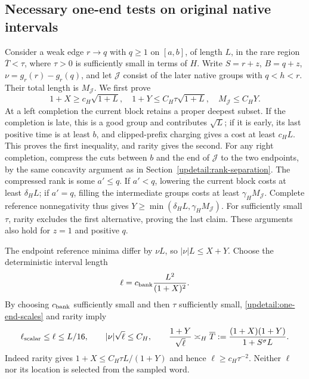 \subsection{Necessary one-end tests on original native intervals}
\label{updetail:one-end-banks}
Consider a weak edge $r\to q$ with $q\geq1$ on $[a,b]$, of length
$L$, in the rare region $\overline T<\tau$, where $\tau>0$ is
sufficiently small in terms of $H$. Write $S=r+z$, $B=q+z$, $\nu=g_r(r)-g_r(q)$, and let
$\mathcal J$ consist of the later native groups with $q<h<r$.
Their total length is $M_{\mathcal J}$.
We first prove
\begin{equation}
 1+X\geq c_H\sqrt{1+L},\quad
 1+Y\leq C_H\tau\sqrt{1+L},\quad M_{\mathcal J}\leq C_HY.
 \label{updetail:one-end-scales}
\end{equation}
At a left completion the current block retains a proper deepest
subset. If the completion is late, this is a good group and contributes
$\sqrt L$; if it is early, its last positive time is at least $b$,
and clipped-prefix charging gives a cost at least $c_HL$.
This proves the first inequality, and rarity gives the second.
For any right completion, compress the cuts between $b$ and the end
of $\mathcal J$ to the two endpoints, by the same concavity argument
as in Section~\ref{updetail:rank-separation}. The compressed rank is
some $a'\leq q$. If $a'<q$, lowering the current block costs at least
$\delta_HL$; if $a'=q$, filling the intermediate groups costs at least
$\gamma_HM_{\mathcal J}$. Complete reference nonnegativity thus gives
$Y\geq\min(\delta_HL,\gamma_HM_{\mathcal J})$. For sufficiently small
$\tau$, rarity excludes the first alternative, proving the last claim.
These arguments also hold for $z=1$ and positive $q$.

The endpoint reference minima differ by $\nu L$, so
$|\nu|L\leq X+Y$. Choose the deterministic interval length
\begin{equation}
 \ell=c_{\rm bank}\frac{L^2}{(1+X)^2}.
 \label{updetail:effective-length}
\end{equation}
By choosing $c_{\rm bank}$ sufficiently small and then $\tau$
sufficiently small, \eqref{updetail:one-end-scales} and rarity imply
\[
 \ell_{\rm scalar}\leq\ell\leq L/16,
 \qquad |\nu|\sqrt\ell\leq C_H,
 \qquad
 \frac{1+Y}{\sqrt\ell}\asymp_H
 \overline T:=\frac{(1+X)(1+Y)}{1+S^\sigma L}.
\]
Indeed rarity gives $1+X\leq C_H\tau L/(1+Y)$ and hence
$\ell\geq c_H\tau^{-2}$. Neither $\ell$ nor its location is selected
from the sampled word.

